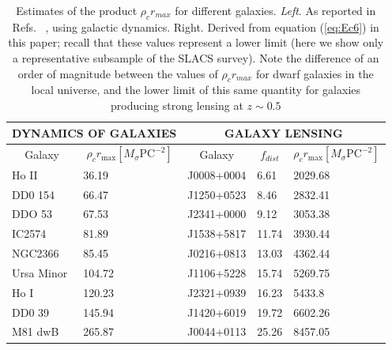 \documentclass[9.5pt, twocolumn]{article}
\begin{document}
\begin{table}
\centering
\begin{tabular}{|l|l|l|l|l|} 
\hline
\multicolumn{2}{|c|}{DYNAMICS OF GALAXIES}                  & \multicolumn{3}{c|}{GALAXY LENSING}                                                        \\ 
\hline
\multicolumn{1}{|c|}{Galaxy} & \multicolumn{1}{c|}{$\rho_{c} r_{\mathrm{max}} \left[ M_{\sigma} \mathrm{PC}^{-2}\right]$} & \multicolumn{1}{c|}{Galaxy} & \multicolumn{1}{c|}{$f_{dist}$} & \multicolumn{1}{c|}{$\rho_{c} r_{\mathrm{max}} \left[ M_{\sigma} \mathrm{PC}^{-2}\right]$}  \\ 
\hline
Ho II                        & 36.19                        & J0008+0004                  & 6.61                         & 2029.68                       \\ 
\hline
DD0 154                      & 66.47                        & J1250+0523                  & 8.46                         & 2832.41                       \\ 
\hline
DDO 53                       & 67.53                        & J2341+0000                  & 9.12                         & 3053.38                       \\ 
\hline
IC2574                       & 81.89                        & J1538+5817                  & 11.74                        & 3930.44                       \\ 
\hline
NGC2366                      & 85.45                        & J0216+0813                  & 13.03                        & 4362.44                       \\ 
\hline
Ursa Minor                   & 104.72                       & J1106+5228                  & 15.74                        & 5269.75                       \\ 
\hline
Ho I                         & 120.23                       & J2321+0939                  & 16.23                        & 5433.8                        \\ 
\hline
DD0 39                       & 145.94                       & J1420+6019                  & 19.72                        & 6602.26                       \\ 
\hline
M81 dwB                      & 265.87                       & J0044+0113                  & 25.26                        & 8457.05                       \\
\hline
\end{tabular}
\caption{Estimates of the product $\rho_{c}r_{max}$ for different galaxies. \textit{Left}. As reported in Refs. ~\cite{Arbey_2003}, using galactic dynamics.
Right. Derived from equation (\ref{eq:Ec6}) in this paper; recall that these values represent a lower limit (here we show only a representative
subsample of the SLACS survey). Note the difference of an order of magnitude between the values of $\rho_{c}r_{max}$ for dwarf galaxies
in the local universe, and the lower limit of this same quantity for galaxies producing strong lensing at $z\sim 0.5$}
\label{table:Tabla1}
\end{table}
\end{document}
